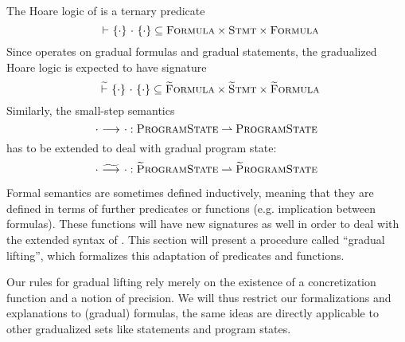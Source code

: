 The Hoare logic of \svl is a ternary predicate $${~} \,\,{\vdash}\,\, \{{\cdot}\} ~{\cdot}~ \{{\cdot}\} \subseteq \textup{\textsc{Formula}} \times \textup{\textsc{Stmt}} \times \textup{\textsc{Formula}}$$
Since \gvl operates on gradual formulas and gradual statements, the gradualized Hoare logic is expected to have signature $${~} \,\,\widetilde{\vdash}\,\, \{{\cdot}\} ~{\cdot}~ \{{\cdot}\} \subseteq \textup{\textsc{\ensuremath{\widetilde{\text{F}}}ormula}} \times \textup{\textsc{\ensuremath{\widetilde{\text{S}}}tmt}} \times \textup{\textsc{\ensuremath{\widetilde{\text{F}}}ormula}}$$
Similarly, the small-step semantics
$${\cdot} \,\,{\longrightarrow^{}}\,\, {\cdot} : \textup{\textsc{ProgramState}} \rightharpoonup \textup{\textsc{ProgramState}}$$
has to be extended to deal with gradual program state:
$${\cdot} \,\,{\widetilde{\longrightarrow}^{}}\,\, {\cdot} : \textup{\textsc{\ensuremath{\widetilde{\text{P}}}rogramState}} \rightharpoonup \textup{\textsc{\ensuremath{\widetilde{\text{P}}}rogramState}}$$

Formal semantics are sometimes defined inductively, meaning that they are defined in terms of further predicates or functions (e.g. implication between formulas).
These functions will have new signatures as well in order to deal with the extended syntax of \gvl.
This section will present a procedure called “gradual lifting”, which formalizes this adaptation of predicates and functions.

\begin{comment}[Gradual Lifting]
    The procedure of extending an existing predicate/function in order to deal with gradual formulas.
    The resulting predicate/function has the same signature as the original one, with occurrences of \setFormula, \setStmt and \setProgramState replaced by \setGFormula, \setGStmt, \setGProgramState.
\end{comment}

Our rules for gradual lifting rely merely on the existence of a concretization function and a notion of precision.
We will thus restrict our formalizations and explanations to (gradual) formulas, the same ideas are directly applicable to other gradualized sets like statements and program states.